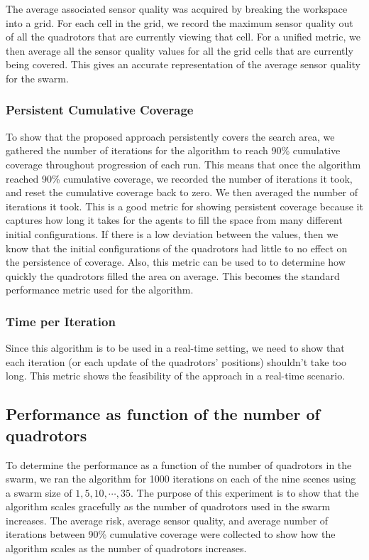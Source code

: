 \documentclass{article}
\begin{document}
The average associated sensor quality was acquired by breaking the workspace
into a grid. For each cell in the grid, we record the maximum sensor quality
out of all the quadrotors that are currently viewing that cell. For a unified
metric, we then average all the sensor quality values for all the grid cells
that are currently being covered. This gives an accurate representation of the
average sensor quality for the swarm.

\subsubsection{Persistent Cumulative Coverage}

To show that the proposed approach persistently covers the search area, we
gathered the number of iterations for the algorithm to reach 90\% cumulative
coverage throughout progression of each run. This means that once the algorithm
reached 90\% cumulative coverage, we recorded the number of iterations it took,
and reset the cumulative coverage back to zero. We then averaged the number of
iterations it took. This is a good metric for showing persistent coverage
because it captures how long it takes for the agents to fill the space from
many different initial configurations. If there is a low deviation between the
values, then we know that the initial configurations of the quadrotors had
little to no effect on the persistence of coverage. Also, this metric can be
used to to determine how quickly the quadrotors filled the area on average.
This becomes the standard performance metric used for the algorithm.

\subsubsection{Time per Iteration}

Since this algorithm is to be used in a real-time setting, we need to show that
each iteration (or each update of the quadrotors' positions) shouldn't take too
long. This metric shows the feasibility of the approach in a real-time
scenario.

\subsection{Performance as function of the number of quadrotors}

To determine the performance as a function of the number of quadrotors in the
swarm, we ran the algorithm for 1000 iterations on each of the nine scenes
using a swarm size of $1, 5, 10, \cdots, 35$. The purpose of this experiment is
to show that the algorithm scales gracefully as the number of quadrotors used
in the swarm increases. The average risk, average sensor quality, and average
number of iterations between 90\% cumulative coverage were collected to show
how the algorithm scales as the number of quadrotors increases.
\end{document}
